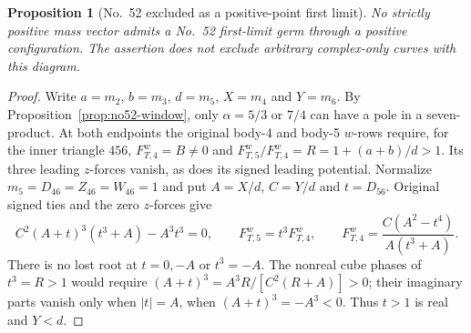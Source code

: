 \documentclass[11pt]{amsart}
\newtheorem{proposition}[theorem]{Proposition}
\theoremstyle{remark}
\begin{document}
\begin{proposition}[No.~52 excluded as a positive-point first limit]\label{prop:no52-excluded}
No strictly positive mass vector admits a No.~52 first-limit germ through a positive configuration. The assertion does not exclude arbitrary complex-only curves with this diagram.
\end{proposition}
\begin{proof}
Write $a=m_2$, $b=m_3$, $d=m_5$, $X=m_4$ and $Y=m_6$. By Proposition~\ref{prop:no52-window}, only $\alpha=5/3$ or $7/4$ can have a pole in a seven-product. At both endpoints the original body-4 and body-5 $w$-rows require, for the inner triangle $456$, $F^w_{T,4}=B\ne0$ and $F^w_{T,5}/F^w_{T,4}=R=1+(a+b)/d>1$. Its three leading $z$-forces vanish, as does its signed leading potential. Normalize $m_5=D_{46}=Z_{46}=W_{46}=1$ and put $A=X/d$, $C=Y/d$ and $t=D_{56}$. Original signed ties and the zero $z$-forces give
\begin{equation}\label{eq:no52-inner-shape}
C^2(A+t)^3(t^3+A)-A^3t^3=0,\qquad F^w_{T,5}=t^3F^w_{T,4},\qquad F^w_{T,4}=\frac{C(A^2-t^4)}{A(t^3+A)}.
\end{equation}
There is no lost root at $t=0,-A$ or $t^3=-A$. The nonreal cube phases of $t^3=R>1$ would require $(A+t)^3=A^3R/[C^2(R+A)] >0$; their imaginary parts vanish only when $|t|=A$, when $(A+t)^3=-A^3<0$. Thus $t>1$ is real and $Y<d$.


\end{proof}
\end{document}
